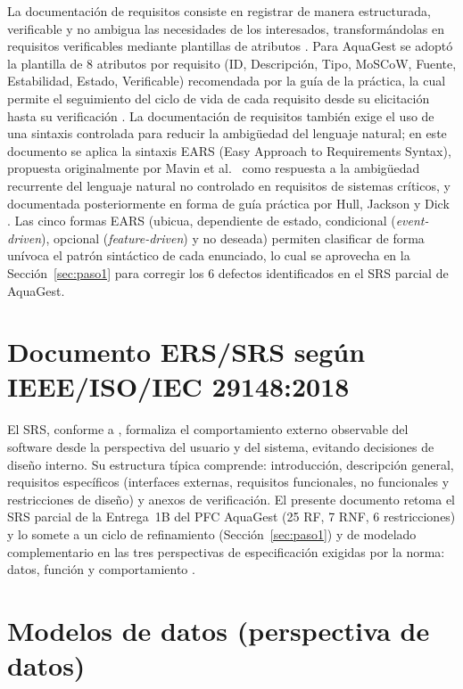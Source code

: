 \documentclass[11pt,a4paper]{report}
\begin{document}
La documentación de requisitos consiste en registrar de manera estructurada, verificable y no ambigua las necesidades de los interesados, transformándolas en requisitos verificables mediante plantillas de atributos \cite{iso29148,pohl2025}. Para AquaGest se adoptó la plantilla de 8 atributos por requisito (ID, Descripción, Tipo, MoSCoW, Fuente, Estabilidad, Estado, Verificable) recomendada por la guía de la práctica, la cual permite el seguimiento del ciclo de vida de cada requisito desde su elicitación hasta su verificación \cite{ireb2022}. La documentación de requisitos también exige el uso de una sintaxis controlada para reducir la ambigüedad del lenguaje natural; en este documento se aplica la sintaxis EARS (Easy Approach to Requirements Syntax), propuesta originalmente por Mavin et al.\ \cite{mavin2009ears} como respuesta a la ambigüedad recurrente del lenguaje natural no controlado en requisitos de sistemas cr\'iticos, y documentada posteriormente en forma de guía práctica por Hull, Jackson y Dick \cite{hull2011}. Las cinco formas EARS (ubicua, dependiente de estado, condicional (\emph{event-driven}), opcional (\emph{feature-driven}) y no deseada) permiten clasificar de forma unívoca el patrón sintáctico de cada enunciado, lo cual se aprovecha en la Sección~\ref{sec:paso1} para corregir los 6 defectos identificados en el SRS parcial de AquaGest.

\section{Documento ERS/SRS según IEEE/ISO/IEC 29148:2018}

El SRS, conforme a \cite{iso29148}, formaliza el comportamiento externo observable del software desde la perspectiva del usuario y del sistema, evitando decisiones de diseño interno. Su estructura típica comprende: introducción, descripción general, requisitos específicos (interfaces externas, requisitos funcionales, no funcionales y restricciones de diseño) y anexos de verificación. El presente documento retoma el SRS parcial de la Entrega~1B del PFC AquaGest (25 RF, 7 RNF, 6 restricciones) y lo somete a un ciclo de refinamiento (Sección~\ref{sec:paso1}) y de modelado complementario en las tres perspectivas de especificación exigidas por la norma: datos, función y comportamiento \cite{iso29148,pohl2025}.

\section{Modelos de datos (perspectiva de datos)}
\end{document}
